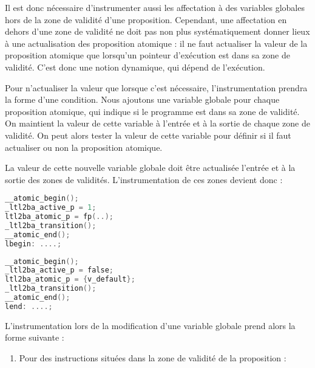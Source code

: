 Il est donc nécessaire d'instrumenter aussi les affectation à des
variables globales hors de la zone de validité d'une proposition.
Cependant, une affectation en dehors d'une zone de validité ne doit pas
non plus systématiquement donner lieux à une actualisation des
proposition atomique : il ne faut actualiser la valeur de la proposition
atomique que lorsqu'un pointeur d'exécution est dans sa zone de
validité. C'est donc une notion dynamique, qui dépend de l'exécution.

Pour n'actualiser la valeur que lorsque c'est nécessaire,
l'instrumentation prendra la forme d'une condition. Nous ajoutons une
variable globale pour chaque proposition atomique, qui indique si le
programme est dans sa zone de validité. On maintient la valeur de cette
variable à l'entrée et à la sortie de chaque zone de validité. On peut
alors tester la valeur de cette variable pour définir si il faut
actualiser ou non la proposition atomique.

La valeur de cette nouvelle variable globale doit être actualisée
l'entrée et à la sortie des zones de validités. L'instrumentation de ces
zones devient donc :

\noindent\begin{minipage}{.45\textwidth}
\begin{lstlisting}[language=C, frame=single, caption=Entrée de zone de validité (2),
  label=lst:instr_in2]
__atomic_begin();
_ltl2ba_active_p = 1;
ltl2ba_atomic_p = fp(..);
_ltl2ba_transition();
__atomic_end();
lbegin: ....;
\end{lstlisting}
\end{minipage}\hfill
\begin{minipage}{.45\textwidth}
\begin{lstlisting}[language=C, frame=single, caption=Sortie de zone de validité (2),
  label=lst:instr_out2]
__atomic_begin();
_ltl2ba_active_p = false;
ltl2ba_atomic_p = {v_default};
_ltl2ba_transition();
__atomic_end();
lend: ....;
\end{lstlisting}
\end{minipage}

L'instrumentation lors de la modification d'une variable globale prend
alors la forme suivante :

\begin{enumerate}
\def\labelenumi{\arabic{enumi})}
\item
  Pour des instructions situées dans la zone de validité de la
  proposition :
\end{enumerate}

